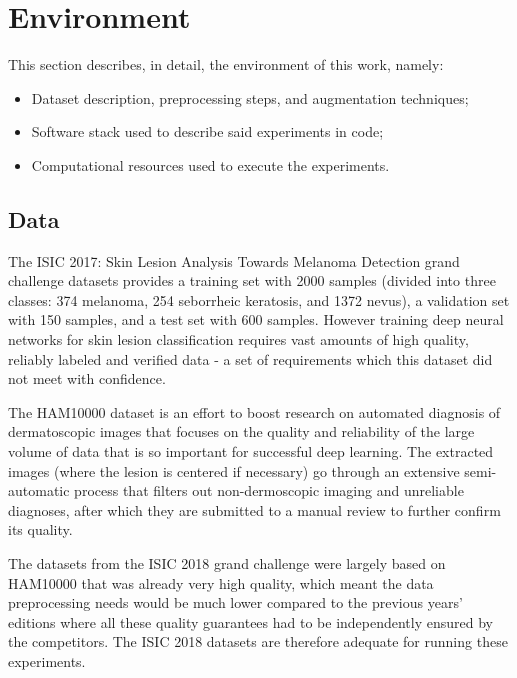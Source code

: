 \chapter{Environment}
\label{chapter:environment}

This section describes, in detail, the environment of this work, namely:

\begin{itemize}
    \item Dataset description, preprocessing steps, and augmentation techniques;
    \item Software stack used to describe said experiments in code;
    \item Computational resources used to execute the experiments.
\end{itemize}

\section{Data}

The \ac{ISIC} 2017: Skin Lesion Analysis Towards Melanoma Detection grand challenge datasets \cite{isic2017} provides a training set with 2000 samples (divided into three classes: 374 melanoma, 254 seborrheic keratosis, and 1372 nevus), a validation set with 150 samples, and a test set with 600 samples. However training deep neural networks for skin lesion classification requires vast amounts of high quality, reliably labeled and verified data - a set of requirements which this dataset did not meet with confidence.

The \ac{HAM10000} \cite{ham10000} dataset is an effort to boost research on automated diagnosis of dermatoscopic images that focuses on the quality and reliability of the large volume of data that is so important for successful deep learning. The extracted images (where the lesion is centered if necessary) go through an extensive semi-automatic process that filters out non-dermoscopic imaging and unreliable diagnoses, after which they are submitted to a manual review to further confirm its quality.

The datasets from the \ac{ISIC} 2018 grand challenge \cite{isic2018} were largely based on \ac{HAM10000} that was already very high quality, which meant the data preprocessing needs would be much lower compared to the previous years' editions where all these quality guarantees had to be independently ensured by the competitors. The \ac{ISIC} 2018 datasets are therefore adequate for running these experiments.

